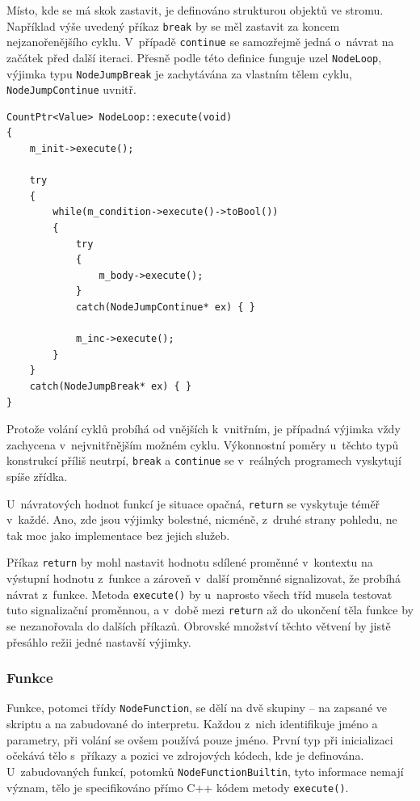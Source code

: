 \documentclass[11pt,twoside,a4paper]{book}
\begin{document}
Místo, kde se má skok zastavit, je definováno strukturou objektů ve stromu. Například výše uvedený příkaz \texttt{break} by se měl zastavit za koncem nejzanořenějšího cyklu. V~případě \texttt{continue} se samozřejmě jedná o~návrat na začátek před další iteraci. Přesně podle této definice funguje uzel \texttt{NodeLoop}, výjimka typu \texttt{NodeJumpBreak} je zachytávána za vlastním tělem cyklu, \texttt{NodeJumpContinue} uvnitř.

\begin{verbatim}
CountPtr<Value> NodeLoop::execute(void)
{
    m_init->execute();

    try
    {
        while(m_condition->execute()->toBool())
        {
            try
            {
                m_body->execute();
            }
            catch(NodeJumpContinue* ex) { }

            m_inc->execute();
        }
    }
    catch(NodeJumpBreak* ex) { }
}
\end{verbatim}

Protože volání cyklů probíhá od vnějších k~vnitřním, je případná výjimka vždy zachycena v~nejvnitřnějším možném cyklu. Výkonnostní poměry u~těchto typů konstrukcí příliš neutrpí, \texttt{break} a \texttt{continue} se v~reálných programech vyskytují spíše zřídka.

U~návratových hodnot funkcí je situace opačná, \texttt{return} se vyskytuje téměř v~každé. Ano, zde jsou výjimky bolestné, nicméně, z~druhé strany pohledu, ne tak moc jako implementace bez jejich služeb.

Příkaz \texttt{return} by mohl nastavit hodnotu sdílené proměnné v~kontextu na výstupní hodnotu z~funkce a zároveň v~další proměnné signalizovat, že probíhá návrat z~funkce. Metoda \texttt{execute()} by u~naprosto všech tříd musela testovat tuto signalizační proměnnou, a v~době mezi \texttt{return} až do ukončení těla funkce by se nezanořovala do dalších příkazů. Obrovské množství těchto větvení by jistě přesáhlo režii jedné nastavší výjimky.


\subsubsection{Funkce}

Funkce, potomci třídy \texttt{NodeFunction}, se dělí na dvě skupiny -- na zapsané ve skriptu a na zabudované do interpretu. Každou z~nich identifikuje jméno a parametry, při volání se ovšem používá pouze jméno. První typ při inicializaci očekává tělo s~příkazy a pozici ve zdrojových kódech, kde je definována. U~zabudovaných funkcí, potomků \texttt{Node\-Function\-Builtin}, tyto informace nemají význam, tělo je specifikováno přímo C++ kódem metody \texttt{execute()}.
\end{document}
